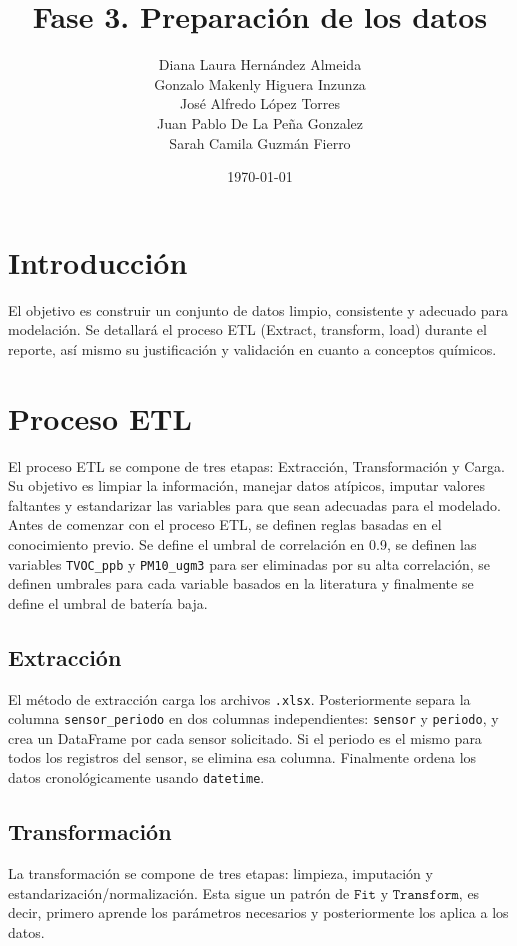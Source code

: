\documentclass{article}
\title{Fase 3. Preparación de los datos}
\author{
    Diana Laura Hernández Almeida \\
    Gonzalo Makenly Higuera Inzunza \\
    José Alfredo López Torres \\
    Juan Pablo De La Peña Gonzalez \\
    Sarah Camila Guzmán Fierro
}
\date{\today}
\begin{document}
\maketitle

\section{Introducción}
El objetivo es construir un conjunto de datos limpio, consistente y adecuado para modelación. Se detallará el proceso ETL (Extract, 
transform, load) durante el reporte, así mismo su justificación y validación en cuanto a conceptos químicos. 

\section{Proceso ETL}
El proceso ETL se compone de tres etapas: Extracción, Transformación y Carga. Su objetivo es limpiar la información, manejar datos
atípicos, imputar valores faltantes y estandarizar las variables para que sean adecuadas para el modelado.
Antes de comenzar con el proceso ETL, se definen reglas basadas en el conocimiento previo. Se define el umbral de correlación en 0.9, 
se definen las variables \texttt{TVOC\_ppb} y \texttt{PM10\_ugm3} para ser eliminadas por su alta correlación, se definen umbrales para cada variable 
basados en la literatura y finalmente se define el umbral de batería baja.

\subsection{Extracción}
El método de extracción carga los archivos \texttt{.xlsx}. Posteriormente separa la columna \texttt{sensor\_periodo} en dos columnas 
independientes: \texttt{sensor} y \texttt{periodo}, y crea un DataFrame por cada sensor solicitado. Si el periodo es el mismo para todos los
registros del sensor, se elimina esa columna. Finalmente ordena los datos cronológicamente usando \texttt{datetime}.

\subsection{Transformación}
La transformación se compone de tres etapas: limpieza, imputación y estandarización/normalización. Esta sigue un patrón de $\texttt{Fit}$ y 
$\texttt{Transform}$, 
es decir, primero aprende los parámetros necesarios y posteriormente los aplica a los datos.
\end{document}
